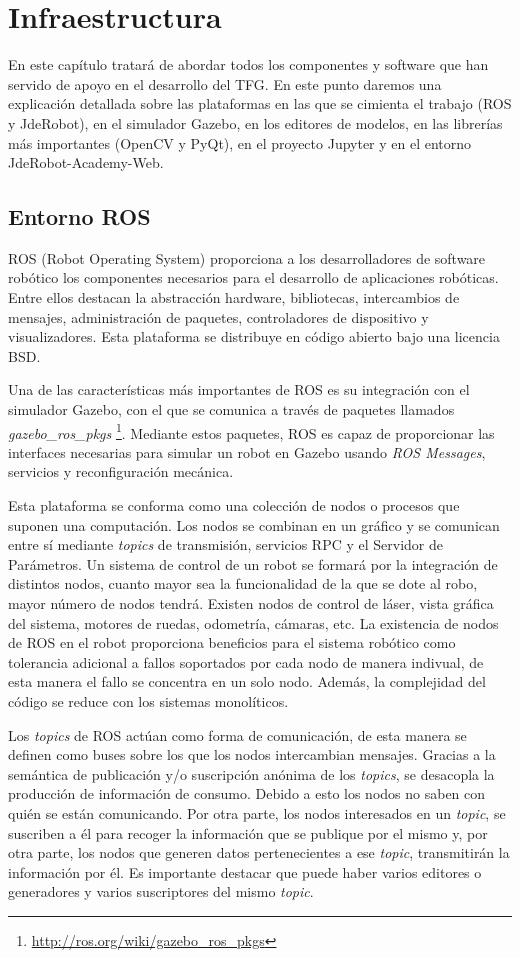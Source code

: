 \chapter{Infraestructura}\label{cap.infraestructura}
En este capítulo tratará de abordar todos los componentes y software que han servido de apoyo en el desarrollo del TFG. En este punto daremos una explicación detallada sobre las plataformas en las que se cimienta el trabajo (ROS y JdeRobot), en el simulador Gazebo, en los editores de modelos, en las librerías más importantes (OpenCV y PyQt), en el proyecto Jupyter y en el entorno JdeRobot-Academy-Web.

\section{Entorno ROS}
ROS (Robot Operating System) proporciona a los desarrolladores de software robótico los componentes necesarios para el desarrollo de aplicaciones robóticas. Entre ellos destacan la abstracción hardware, bibliotecas, intercambios de mensajes, administración de paquetes, controladores de dispositivo y visualizadores. Esta plataforma se distribuye en código abierto bajo una licencia BSD.

Una de las características más importantes de ROS es su integración con el simulador Gazebo, con el que se comunica a través de paquetes llamados \textit{gazebo\_ros\_pkgs} \footnote{\url{http://ros.org/wiki/gazebo\_ros\_pkgs}}. Mediante estos paquetes, ROS es capaz de proporcionar las interfaces necesarias para simular un robot en Gazebo usando \textit{ROS Messages}, servicios y reconfiguración mecánica.

Esta plataforma se conforma como una colección de nodos o procesos que suponen una computación. Los nodos se combinan en un gráfico y se comunican entre sí mediante \textit{topics} de transmisión, servicios RPC y el Servidor de Parámetros. Un sistema de control de un robot se formará por la integración de distintos nodos, cuanto mayor sea la funcionalidad de la que se dote al robo, mayor número de nodos tendrá. Existen nodos de control de láser, vista gráfica del sistema, motores de ruedas, odometría, cámaras, etc. La existencia de nodos de ROS en el robot proporciona beneficios para el sistema robótico como tolerancia adicional a fallos soportados por cada nodo de manera indivual, de esta manera el fallo se concentra en un solo nodo. Además, la complejidad del código se reduce con los sistemas monolíticos.

Los \textit{topics} de ROS actúan como forma de comunicación, de esta manera se definen como buses sobre los que los nodos intercambian mensajes. Gracias a la semántica de publicación y/o suscripción anónima de los \textit{topics}, se desacopla la producción de información de consumo. Debido a esto los nodos no saben con quién se están comunicando. Por otra parte, los nodos interesados en un \textit{topic}, se suscriben a él para recoger la información que se publique por el mismo y, por otra parte, los nodos que generen datos pertenecientes a ese \textit{topic}, transmitirán la información por él. Es importante destacar que puede haber varios editores o generadores y varios suscriptores del mismo \textit{topic}.


